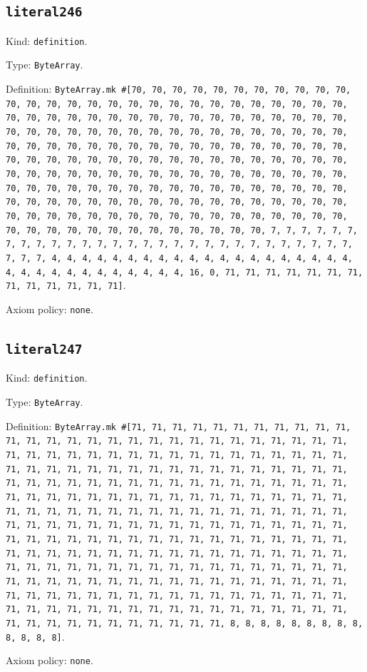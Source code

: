 \documentclass[11pt]{article}
\begin{document}
\subsection*{\texttt{literal246}}
\noindent Kind: \texttt{definition}.\par
\noindent Type: \texttt{ByteArray}.\par
\noindent Definition: \texttt{ByteArray.mk \#[70, 70, 70, 70, 70, 70, 70, 70, 70, 70, 70, 70, 70, 70, 70, 70, 70, 70, 70, 70, 70, 70, 70, 70, 70, 70, 70, 70, 70, 70, 70, 70, 70, 70, 70, 70, 70, 70, 70, 70, 70, 70, 70, 70, 70, 70, 70, 70, 70, 70, 70, 70, 70, 70, 70, 70, 70, 70, 70, 70, 70, 70, 70, 70, 70, 70, 70, 70, 70, 70, 70, 70, 70, 70, 70, 70, 70, 70, 70, 70, 70, 70, 70, 70, 70, 70, 70, 70, 70, 70, 70, 70, 70, 70, 70, 70, 70, 70, 70, 70, 70, 70, 70, 70, 70, 70, 70, 70, 70, 70, 70, 70, 70, 70, 70, 70, 70, 70, 70, 70, 70, 70, 70, 70, 70, 70, 70, 70, 70, 70, 70, 70, 70, 70, 70, 70, 70, 70, 70, 70, 70, 70, 70, 70, 70, 70, 70, 70, 70, 70, 70, 70, 70, 70, 70, 70, 70, 70, 70, 70, 70, 70, 70, 70, 70, 70, 70, 70, 70, 70, 70, 70, 70, 70, 70, 70, 70, 7, 7, 7, 7, 7, 7, 7, 7, 7, 7, 7, 7, 7, 7, 7, 7, 7, 7, 7, 7, 7, 7, 7, 7, 7, 7, 7, 7, 7, 7, 7, 7, 4, 4, 4, 4, 4, 4, 4, 4, 4, 4, 4, 4, 4, 4, 4, 4, 4, 4, 4, 4, 4, 4, 4, 4, 4, 4, 4, 4, 4, 4, 4, 4, 16, 0, 71, 71, 71, 71, 71, 71, 71, 71, 71, 71, 71, 71, 71]}.\par
\noindent Axiom policy: \texttt{none}.\par
\subsection*{\texttt{literal247}}
\noindent Kind: \texttt{definition}.\par
\noindent Type: \texttt{ByteArray}.\par
\noindent Definition: \texttt{ByteArray.mk \#[71, 71, 71, 71, 71, 71, 71, 71, 71, 71, 71, 71, 71, 71, 71, 71, 71, 71, 71, 71, 71, 71, 71, 71, 71, 71, 71, 71, 71, 71, 71, 71, 71, 71, 71, 71, 71, 71, 71, 71, 71, 71, 71, 71, 71, 71, 71, 71, 71, 71, 71, 71, 71, 71, 71, 71, 71, 71, 71, 71, 71, 71, 71, 71, 71, 71, 71, 71, 71, 71, 71, 71, 71, 71, 71, 71, 71, 71, 71, 71, 71, 71, 71, 71, 71, 71, 71, 71, 71, 71, 71, 71, 71, 71, 71, 71, 71, 71, 71, 71, 71, 71, 71, 71, 71, 71, 71, 71, 71, 71, 71, 71, 71, 71, 71, 71, 71, 71, 71, 71, 71, 71, 71, 71, 71, 71, 71, 71, 71, 71, 71, 71, 71, 71, 71, 71, 71, 71, 71, 71, 71, 71, 71, 71, 71, 71, 71, 71, 71, 71, 71, 71, 71, 71, 71, 71, 71, 71, 71, 71, 71, 71, 71, 71, 71, 71, 71, 71, 71, 71, 71, 71, 71, 71, 71, 71, 71, 71, 71, 71, 71, 71, 71, 71, 71, 71, 71, 71, 71, 71, 71, 71, 71, 71, 71, 71, 71, 71, 71, 71, 71, 71, 71, 71, 71, 71, 71, 71, 71, 71, 71, 71, 71, 71, 71, 71, 71, 71, 71, 71, 71, 71, 71, 71, 71, 71, 71, 71, 71, 71, 71, 71, 71, 71, 71, 71, 71, 71, 71, 71, 71, 71, 71, 8, 8, 8, 8, 8, 8, 8, 8, 8, 8, 8, 8, 8]}.\par
\noindent Axiom policy: \texttt{none}.\par
\end{document}
